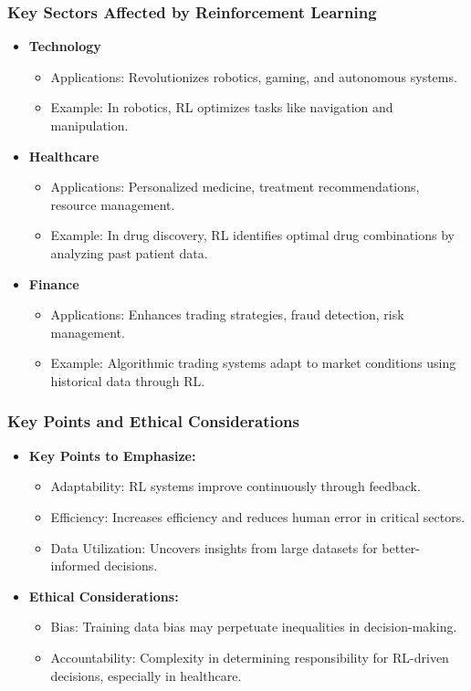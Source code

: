 \documentclass[aspectratio=169]{beamer}
\begin{document}
\begin{frame}[fragile]
  \frametitle{Key Sectors Affected by Reinforcement Learning}
  \begin{itemize}
    \item \textbf{Technology}
      \begin{itemize}
        \item Applications: Revolutionizes robotics, gaming, and autonomous systems.
        \item Example: In robotics, RL optimizes tasks like navigation and manipulation. 
      \end{itemize}
    \item \textbf{Healthcare}
      \begin{itemize}
        \item Applications: Personalized medicine, treatment recommendations, resource management.
        \item Example: In drug discovery, RL identifies optimal drug combinations by analyzing past patient data.
      \end{itemize}
    \item \textbf{Finance}
      \begin{itemize}
        \item Applications: Enhances trading strategies, fraud detection, risk management.
        \item Example: Algorithmic trading systems adapt to market conditions using historical data through RL.
      \end{itemize}
  \end{itemize}
\end{frame}

\begin{frame}[fragile]
  \frametitle{Key Points and Ethical Considerations}
  \begin{itemize}
    \item \textbf{Key Points to Emphasize:}
      \begin{itemize}
        \item Adaptability: RL systems improve continuously through feedback.
        \item Efficiency: Increases efficiency and reduces human error in critical sectors.
        \item Data Utilization: Uncovers insights from large datasets for better-informed decisions.
      \end{itemize}
    \item \textbf{Ethical Considerations:}
      \begin{itemize}
        \item Bias: Training data bias may perpetuate inequalities in decision-making.
        \item Accountability: Complexity in determining responsibility for RL-driven decisions, especially in healthcare.
      \end{itemize}
  \end{itemize}
\end{frame}
\end{document}
